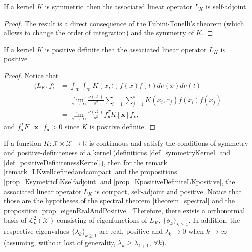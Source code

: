 \begin{proposition} \label{prop_KsymetricLKselfadjoint}
  If a kernel $K$ is symmetric, then the associated linear operator $L_K$ is self-adjoint.
  \begin{proof}
  The result is a direct consequence of the Fubini-Tonelli's theorem (which allows to change the order of integration) and the symmetry of $K$.
  \end{proof}
\end{proposition}

\begin{proposition} \label{prop_KpositiveDefiniteLKpositive}
  If a kernel $K$ is positive definite then the associated linear operator $L_K$ is positive.
  \begin{proof} Notice that
    \begin{equation*} \begin{aligned}
      \langle L_K , f \rangle &= \int_{\mathcal{X}} \int_{\mathcal{X}} K(x,t)f(x)f(t) d\nu(x) d\nu(t) \\
                              &= \lim_{s \to \infty} \frac{\nu(\mathcal{X})}{s^2} 
                                  \sum_{i=1}^s \sum_{j=1}^s K(x_i,x_j)f(x_i)f(x_j) \\
                              &= \lim_{s \to \infty} \frac{\nu(\mathcal{X})}{s^2} 
                                           f_{\pmb{x}}^T K[\pmb{x}] f_{\pmb{x}},
    \end{aligned} \end{equation*}
    and $f_{\pmb{x}}^T K[\pmb{x}] f_{\pmb{x}} > 0$ since $K$ is positive definite.
  \end{proof}
\end{proposition}

\begin{remark} \label{remark_mercerKernelTopropetiesOfTheOperator}
  If a function $K: \mathcal{X} \times \mathcal{X} \to \mathbb{R}$ is continuous and satisfy the conditions of symmetry and positive-definiteness of a kernel (definitions \ref{def_symmetryKernel} and \ref{def_positiveDefinitenessKernel}), then for the remark \ref{remark_LKwelldefinedandcompact} and the propositions \ref{prop_KsymetricLKselfadjoint} and \ref{prop_KpositiveDefiniteLKpositive}, the associated linear operator $L_K$ is compact, self-adjoint and positive. Notice that those are the hypotheses of the spectral theorem \ref{theorem_spectral} and the proposition \ref{prop_eigenRealAndPositive}. Therefore, there exists a orthonormal basis of $\mathcal{L}^2_{\nu}(\mathcal{X})$ consisting of eigenfunctions of $L_K$, $\{ \phi_k \}_{k \geq 1}$. In addition, the respective eigenvalues $\{ \lambda_k \}_{k \geq 1}$ are real, positive and $\lambda_k \to 0$ when $k \to \infty$ (assuming, without lost of generality, $\lambda_k \geq \lambda_{k+1}$, $\forall k$).
\end{remark}

